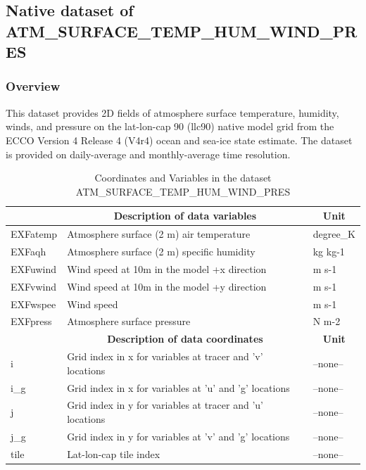 \subsection{Native dataset of ATM\_SURFACE\_TEMP\_HUM\_WIND\_PRES}
\newp
\subsubsection{Overview}
This dataset provides 2D fields of atmosphere surface temperature, humidity, winds, and pressure on the lat-lon-cap 90 (llc90) native model grid from the ECCO Version 4 Release 4 (V4r4) ocean and sea-ice state estimate. The dataset is provided on daily-average and monthly-average time resolution. 
\begin{longtable}{|m{}|m{}|m{}|}
\caption{Coordinates and Variables in the dataset ATM\_SURFACE\_TEMP\_HUM\_WIND\_PRES}
\label{tab:table-ATM_SURFACE_TEMP_HUM_WIND_PRES-fields} \\ 
\hline \endhead \hline \endfoot
\rowcolor{lightgray} \multicolumn{1}{|c|}{\textbf{Variables}} & \multicolumn{1}{|c|}{\textbf{Description of data variables}} &  \multicolumn{1}{|c|}{\textbf{Unit}}\\ \hline
EXFatemp &Atmosphere surface (2 m) air temperature  &degree\_K  \\ \hline
EXFaqh &Atmosphere surface (2 m) specific humidity  &kg kg-1  \\ \hline
EXFuwind &Wind speed at 10m in the model +x direction &m s-1  \\ \hline
EXFvwind &Wind speed at 10m in the model +y direction &m s-1  \\ \hline
EXFwspee &Wind speed &m s-1  \\ \hline
EXFpress &Atmosphere surface pressure &N m-2  \\ \hline
\rowcolor{lightgray} \multicolumn{1}{|c|}{\textbf{Coordinates}} & \multicolumn{1}{|c|}{\textbf{Description of data coordinates}} &  \multicolumn{1}{|c|}{\textbf{Unit}}\\ \hline
i &Grid index in x for variables at tracer and 'v' locations &--none--  \\ \hline
i\_g &Grid index in x for variables at 'u' and 'g' locations &--none--  \\ \hline
j &Grid index in y for variables at tracer and 'u' locations &--none--  \\ \hline
j\_g &Grid index in y for variables at 'v' and 'g' locations &--none--  \\ \hline
tile &Lat-lon-cap tile index &--none--  \\ \hline

\end{longtable}
